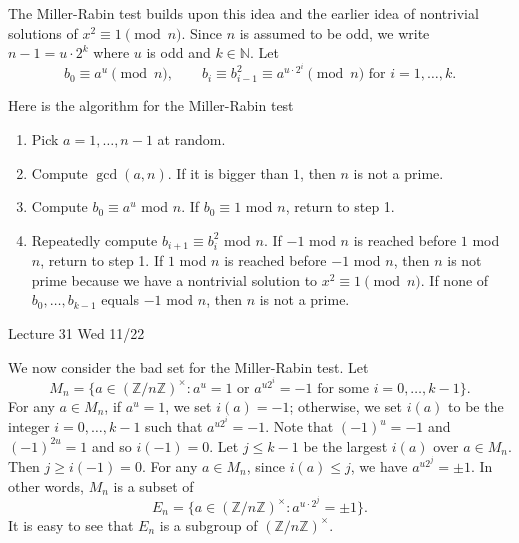 \documentclass{article}
\def\Z{{\mathbb Z}}
\def\N{{\mathbb N}}
\def\Z{{\mathbb Z}}
\newcommand{\add}[1]{{\color{blue} #1}}
\begin{document}
The Miller-Rabin test builds upon this idea and the earlier idea of nontrivial solutions of $x^2\equiv 1\pmod{n}$. Since $n$ is assumed to be odd, we write $n - 1 = u\cdot 2^k$ where $u$ is odd and $k\in\N$. Let $$b_0\equiv a^u\pmod{n}, \qquad b_i\equiv b_{i-1}^2\equiv a^{u\cdot 2^{i}}\pmod{n}\mbox{ for }i = 1,\ldots,k.$$

Here is the algorithm for the Miller-Rabin test
\begin{enumerate}
    \item Pick $a = 1,\ldots,n-1$ at random.
    \item Compute $\gcd(a,n)$. If it is bigger than $1$, then $n$ is not a prime.
    \item Compute $b_0\equiv a^u$ mod $n$. If $b_0\equiv 1$ mod $n$, return to step 1.
    \item Repeatedly compute $b_{i+1}\equiv b_i^2$ mod $n$. If $-1$ mod $n$ is reached before $1$ mod $n$, return to step 1. If $1$ mod $n$ is reached before $-1$ mod $n$, then $n$ is not prime because we have a nontrivial solution to $x^2\equiv 1\pmod{n}$. If none of $b_0,\ldots, b_{k-1}$ equals $-1$ mod $n$, then $n$ is not a prime.
\end{enumerate}

\begin{center}
    \add{Lecture 31 Wed 11/22}
\end{center}

We now consider the bad set for the Miller-Rabin test. Let 
$$M_n = \{a\in(\Z/n\Z)^\times\colon a^u = 1\mbox{ or }a^{u2^i} = -1\mbox{ for some }i=0,\ldots,k-1\}.$$
For any $a\in M_n$, if $a^u = 1$, we set $i(a) = -1$; otherwise, we set $i(a)$ to be the integer $i = 0,\ldots,k-1$ such that $a^{u2^i} = -1$. Note that $(-1)^u = -1$ and $(-1)^{2u} = 1$ and so $i(-1) = 0$. Let $j\leq k-1$ be the largest $i(a)$ over $a\in M_n$. Then $j\geq i(-1) = 0$. For any $a\in M_n$, since $i(a)\leq j$, we have $a^{u2^j} = \pm 1$. In other words, $M_n$ is a subset of
$$E_n = \{a\in (\Z/n\Z)^\times\colon a^{u\cdot2^j} = \pm 1\}.$$ 
It is easy to see that $E_n$ is a subgroup of $(\Z/n\Z)^\times$.
\end{document}
